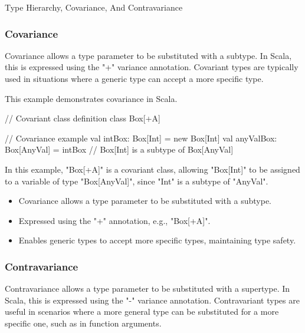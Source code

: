 \begin{notes}{Type Hierarchy, Covariance, And Contravariance}
\begin{highlight}
    \end{highlight}
    
    \subsubsection*{Covariance}
    
    Covariance allows a type parameter to be substituted with a subtype. In Scala, this is expressed using the "+" variance annotation. Covariant types are typically used in situations where a generic 
    type can accept a more specific type.
    
    \begin{highlight}[Covariance]
    
        This example demonstrates covariance in Scala.
    
    \begin{code}[Scala]
    // Covariant class definition
    class Box[+A]
    
    // Covariance example
    val intBox: Box[Int] = new Box[Int]
    val anyValBox: Box[AnyVal] = intBox  // Box[Int] is a subtype of Box[AnyVal]
    \end{code}
    
        In this example, "Box[+A]" is a covariant class, allowing "Box[Int]" to be assigned to a variable of type "Box[AnyVal]", since "Int" is a subtype of "AnyVal".
    
        \begin{itemize}
            \item Covariance allows a type parameter to be substituted with a subtype.
            \item Expressed using the "+" annotation, e.g., "Box[+A]".
            \item Enables generic types to accept more specific types, maintaining type safety.
        \end{itemize}
    
    \end{highlight}
    
    \subsubsection*{Contravariance}
    
    Contravariance allows a type parameter to be substituted with a supertype. In Scala, this is expressed using the "-" variance annotation. Contravariant types are useful in scenarios where a more 
    general type can be substituted for a more specific one, such as in function arguments.
    

\end{notes}
